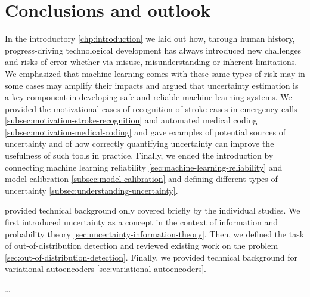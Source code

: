 
\chapter[conclusions and outlook]{Conclusions and outlook}\label{chp:conclusion}

In the introductory \cref{chp:introduction} we laid out how, through human history, progress-driving technological development has always introduced new challenges and risks of error whether via misuse, misunderstanding or inherent limitations. We emphasized that machine learning comes with these same types of risk may in some cases may amplify their impacts and argued that uncertainty estimation is a key component in developing safe and reliable machine learning systems. We provided the motivational cases of recognition of stroke cases in emergency calls \cref{subsec:motivation-stroke-recognition} and automated medical coding \cref{subsec:motivation-medical-coding} and gave examples of potential sources of uncertainty and of how correctly quantifying uncertainty can improve the usefulness of such tools in practice. Finally, we ended the introduction by connecting machine learning reliability \cref{sec:machine-learning-reliability} and model calibration \cref{subsec:model-calibration} and defining different types of uncertainty \cref{subsec:understanding-uncertainty}.

 provided technical background only covered briefly by the individual studies. We first introduced uncertainty as a concept in the context of information and probability theory \cref{sec:uncertainty-information-theory}. Then, we defined the task of out-of-distribution detection and reviewed existing work on the problem \cref{sec:out-of-distribution-detection}. Finally, we provided technical background for variational autoencoders \cref{sec:variational-autoencoders}.

\dots
